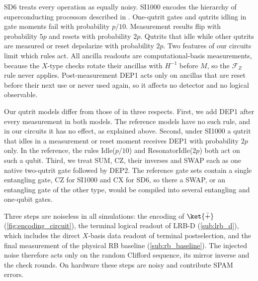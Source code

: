SD6 treats every operation as equally noisy. SI1000 encodes the hierarchy of superconducting processors described in \cite{GidneyHoneycomb2021}. One-qutrit gates and qutrits idling in gate moments fail with probability $p/10$. Measurement results flip with probability $5p$ and resets with probability $2p$. Qutrits that idle while other qutrits are measured or reset depolarize with probability $2p$. Two features of our circuits limit which rules act. All ancilla readouts are computational-basis measurements, because the $X$-type checks rotate their ancillas with $H^{-1}$ before $M$, so the $\mathcal{F}_Z$ rule never applies. Post-measurement DEP1 acts only on ancillas that are reset before their next use or never used again, so it affects no detector and no logical observable.

Our qutrit models differ from those of \cite{GidneyHoneycomb2021} in three respects. First, we add DEP1 after every measurement in both models. The reference models have no such rule, and in our circuits it has no effect, as explained above. Second, under SI1000 a qutrit that idles in a measurement or reset moment receives DEP1 with probability $2p$ only. In the reference, the rules Idle($p/10$) and ResonatorIdle($2p$) both act on such a qubit. Third, we treat SUM, CZ, their inverses and SWAP each as one native two-qutrit gate followed by DEP2. The reference gate sets contain a single entangling gate, CZ for SI1000 and CX for SD6, so there a SWAP, or an entangling gate of the other type, would be compiled into several entangling and one-qubit gates.

Three steps are noiseless in all simulations: the encoding of $\ket{\bar{+}}$ (\autoref{fig:encoding_circuit}), the terminal logical readout of LRB-D (\autoref{sub:lrb_d}), which includes the direct $X$-basis data readout of terminal postselection, and the final measurement of the physical RB baseline (\autoref{sub:rb_baseline}). The injected noise therefore acts only on the random Clifford sequence, its mirror inverse and the check rounds. On hardware these steps are noisy and contribute SPAM errors.
